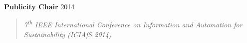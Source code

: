 \documentclass[mm]{./assets/res} %
\begin{document}
\begin{resume}



\textbf{Publicity Chair} \hfill 2014 
\begin{quote}
\emph{7\textsuperscript{th} IEEE International Conference on Information and Automation for Sustainability (ICIAfS 2014)}
\end{quote}








\end{resume}
\end{document}
